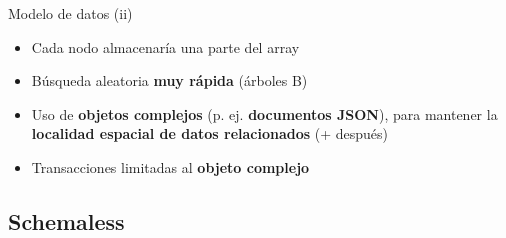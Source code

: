 \documentclass[14pt]{beamer}
\begin{document}
\begin{frame}
\begin{overlayarea}{\textwidth}{.8\textheight}
{\begin{block}{Modelo de datos (ii)}
\begin{itemize}
\begin{itemize}
\item Cada nodo almacenaría una parte del array
\item Búsqueda aleatoria {\bf muy rápida} (árboles B)
\item Uso de {\bf objetos complejos} (p. ej. {\bf documentos JSON}),
  para mantener la {\bf localidad espacial de datos relacionados} (+
  después)
\item Transacciones limitadas al {\bf objeto complejo}
\end{itemize}
\end{itemize}
\end{block}%
}%
\end{overlayarea}
\end{frame}

\subsection{Schemaless}
\end{document}
